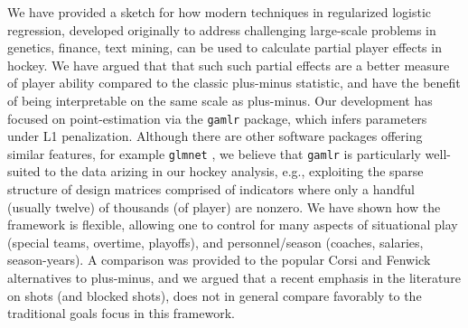 We have provided a sketch for how modern techniques in regularized logistic
regression, developed originally to address challenging large-scale problems
in genetics, finance, text mining, can be used to calculate partial player
effects in hockey.  We have argued that that such such partial effects are a
better measure of player ability compared to the classic plus-minus statistic,
and have the benefit of being interpretable on the same scale as plus-minus.
Our development has focused on point-estimation via the {\tt gamlr} package,
which infers parameters under L1 penalization.  Although there are other
software packages offering similar features, for example {\tt glmnet}
\cite{zou_regularization_2005}, we believe that {\tt gamlr} is particularly
well-suited to the data arizing in our hockey analysis, e.g., exploiting the
sparse structure of design matrices comprised of indicators where only a
handful (usually twelve) of thousands (of player) are nonzero. We have shown
how the framework is flexible, allowing one to control for many aspects of
situational play (special teams, overtime, playoffs), and personnel/season
(coaches, salaries, season-years).  A comparison was provided to the popular
Corsi and Fenwick alternatives to plus-minus, and we argued that a recent
emphasis in the literature on shots (and blocked shots), does not in general
compare favorably to the traditional goals focus in this framework.

